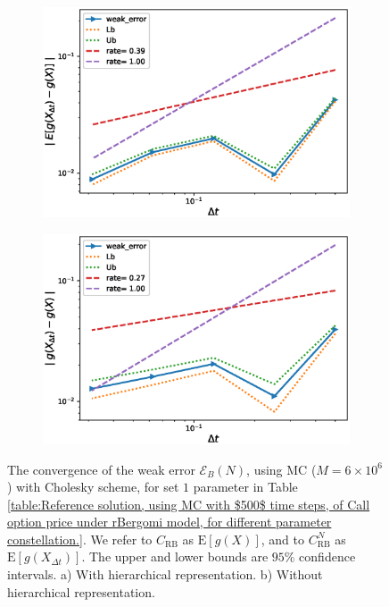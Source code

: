 \documentclass[11pt]{article}
\newcommand{\expt}[1]{\mathrm{E}\left[#1\right]}
\begin{document}
\FloatBarrier
\begin{figure}[h!]
	\centering
	\begin{subfigure}{.5\textwidth}
		\centering
		\includegraphics[width=1\linewidth]{./figures/rBergomi_weak_error_cholesky/weak_convergence_order_Bergomi_H_007_K_1_M_6_10_6_CI_relative_cholesky_hierarchical}
		\caption{}
		\label{fig:sub3}
	\end{subfigure}%
	\begin{subfigure}{.5\textwidth}
		\centering
		\includegraphics[width=1\linewidth]{./figures/rBergomi_weak_error_cholesky/weak_convergence_order_Bergomi_H_007_K_1_M_10_6_CI_relative_cholesky_non_hierarchical}
		\caption{}
		\label{fig:sub4}
	\end{subfigure}
	
	\caption{The  convergence of the weak error $\mathcal{E}_B(N)$, using MC ($M=6 \times 10^6$) with Cholesky scheme, for set $1$ parameter in Table \ref{table:Reference solution, using MC with $500$ time steps, of Call option price under rBergomi model, for different parameter constellation.}. We refer to $C_{\text{RB}}$ as $\expt{g(X)}$, and to $C_{\text{RB}}^{N}$ as  $\expt{g(X_{\Delta t})}$. The upper and lower bounds are $95\%$ confidence intervals. a) With hierarchical representation.  b) Without hierarchical representation.}
	\label{fig:Weak_rate_set1_set_2_without_rich}
\end{figure}
\FloatBarrier
\end{document}
